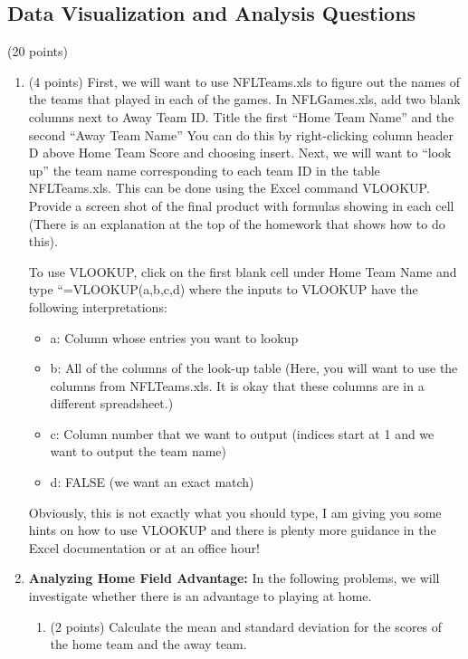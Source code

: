 \documentclass{article}    %
\begin{document}
\subsection*{Data Visualization and Analysis Questions}(20 points)
\begin{enumerate}
\item (4 points) First, we will want to use NFLTeams.xls to figure out the names of the teams that played in each of the games.  In NFLGames.xls, add two blank columns next to Away Team ID. Title the first ``Home Team Name'' and the second ``Away Team Name''  You can do this by right-clicking column header D above Home Team Score and choosing insert.  Next, we will want to ``look up'' the team name corresponding to each team ID in the table NFLTeams.xls. This can be done using the Excel command VLOOKUP.  Provide a screen shot of the final product with formulas showing in each cell (There is an explanation at the top of the homework that shows how to do this).

To use VLOOKUP, click on the first blank cell under Home Team Name and type ``=VLOOKUP(a,b,c,d) where the inputs to VLOOKUP have the following interpretations:  
\begin{itemize}
\item a: Column whose entries you want to lookup
\item b: All of the columns of the look-up table (Here, you will want to use the columns from NFLTeams.xls.  It is okay that these columns are in a different spreadsheet.)
\item c: Column number that we want to output (indices start at 1 and we want to output the team name)
\item d: FALSE (we want an exact match)
\end{itemize}

Obviously, this is not exactly what you should type, I am giving you some hints on how to use VLOOKUP and there is plenty more guidance in the Excel documentation or at an office hour!       



\item \textbf{Analyzing Home Field Advantage:} In the following problems, we will investigate whether there is an advantage to playing at home.

\begin{enumerate}
\item (2 points)  Calculate the mean and standard deviation for the scores of the home team and the away team.


\end{enumerate}
\end{enumerate}
\end{document}
